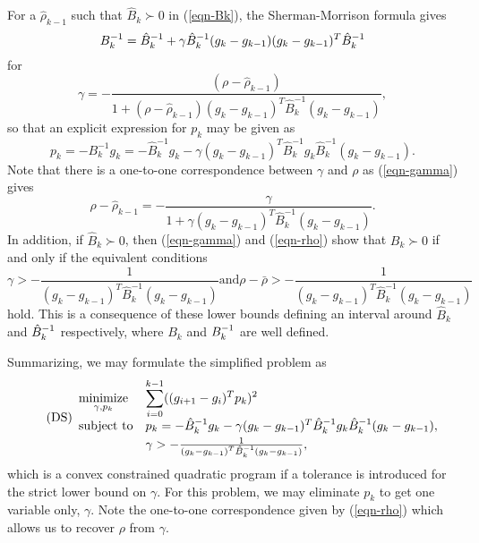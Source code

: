 \documentclass[11pt,twoside]{article}
\def\AFcomment#1{{\color{red}\emph{AF: #1}}}
\begin{document}

For a $\hat\rho_{k-1}$ such that $\hat B_k \succ 0$ in (\ref{eqn-Bk}), the
Sherman-Morrison formula gives
\begin{equation}\label{eqn-Bkinv}
B_k^{-1} = \hat B_k^{-1} + \gamma
 \hat B_k^{-1} ( g_k - g_{k-1} ) ( g_k - g_{k-1} )^T\hat B_k^{-1}
\end{equation}
for
\begin{equation}\label{eqn-gamma}
\gamma=-\frac{(\rho-\hat\rho_{k-1})}{1+(\rho-\hat\rho_{k-1})\left(
    g_k - g_{k-1} \right)^T\hat B_k^{-1}\left( g_k - g_{k-1} \right)},
\end{equation}
so that an explicit expression for $p_k$ may be given as
\[
p_k = -B_k^{-1}g_k
 =-\hat B_k^{-1}g_k - \gamma ( g_k - g_{k-1})^T\hat B_k^{-1} g_k \hat B_k^{-1}
 ( g_k - g_{k-1} ).
\]
Note that there is a one-to-one correspondence between $\gamma$ and
$\rho$ as (\ref{eqn-gamma}) gives
\begin{equation}\label{eqn-rho}
\rho-\hat\rho_{k-1} =-\frac{\gamma}{1+\gamma\left(
    g_k - g_{k-1} \right)^T\hat B_k^{-1}\left( g_k - g_{k-1} \right)}.
\end{equation}
In addition, if $\hat B_k\succ0$, then (\ref{eqn-gamma}) and
(\ref{eqn-rho}) show that $B_k\succ 0$ if and only if the equivalent
conditions
\[
\gamma> -\frac1{(g_k - g_{k-1})^T\hat B_k^{-1}( g_k - g_{k-1} )}
\text{and}
\rho-\bar\rho> -\frac1{(g_k - g_{k-1})^T\hat B_k^{-1}( g_k - g_{k-1} )}
\]
hold. This is a consequence of these lower bounds defining an interval
around $\hat B_k$ and $\hat B_k^{-1}$ respectively, where $B_k$ and
$B_k^{-1}$ are well defined.

Summarizing, we may formulate the simplified problem as
\begin{equation}\label{form:P}\tag{DS}
\begin{array}{ll}
\minimize{\gamma, p_k}& \disp\sum_{i=0}^{k-1} ((g_{i+1}- g_i)^T p_k )^2 \\
\subject & p_k =-\hat B_k^{-1}g_k
 -\gamma (g_k - g_{k-1} )^T\hat B_k^{-1}
 g_k\hat B_k^{-1} ( g_k - g_{k-1} ), \\[1mm]
&\gamma >
  -\frac{1}{\left( g_k - g_{k-1} \right)^T \hat B_k^{-1}\left( g_k - g_{k-1}
    \right)},
\end{array}
\end{equation}
which is a convex constrained quadratic program if a tolerance is
introduced for the strict lower bound on $\gamma$. For this problem,
we may eliminate $p_k$ to get one variable only, $\gamma$. Note the
one-to-one correspondence given by (\ref{eqn-rho}) which allows us to
recover $\rho$ from $\gamma$.
\end{document}
